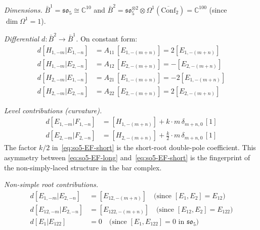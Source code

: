 \begin{computation}

\emph{Dimensions.}
$\bar{B}^1 = \mathfrak{so}_5 \cong \mathbb{C}^{10}$ and
$\bar{B}^2 = \mathfrak{so}_5^{\otimes 2} \otimes \Omega^1(\overline{\mathrm{Conf}}_2)
= \mathbb{C}^{100}$ (since $\dim \Omega^1 = 1$).

\emph{Differential $d\colon \bar{B}^2 \to \bar{B}^1$.}
On constant form:
\begin{align}
d[H_{1,-m}|E_{1,-n}] &= A_{11}\,[E_{1,-(m+n)}] = 2[E_{1,-(m+n)}]
\\
d[H_{1,-m}|E_{2,-n}] &= A_{12}\,[E_{2,-(m+n)}] = -[E_{2,-(m+n)}]
\\
d[H_{2,-m}|E_{1,-n}] &= A_{21}\,[E_{1,-(m+n)}] = -2[E_{1,-(m+n)}]
\\
d[H_{2,-m}|E_{2,-n}] &= A_{22}\,[E_{2,-(m+n)}] = 2[E_{2,-(m+n)}]
\label{eq:so5-H2E2}
\end{align}

\emph{Level contributions (curvature).}
\begin{align}
d[E_{1,-m}|F_{1,-n}] &= [H_{1,-(m+n)}] + k \cdot m\,\delta_{m+n,0}\,[1]
\label{eq:so5-EF-long} \\
d[E_{2,-m}|F_{2,-n}] &= [H_{2,-(m+n)}] + \tfrac{k}{2}\cdot m\,\delta_{m+n,0}\,[1]
\label{eq:so5-EF-short}
\end{align}
The factor $k/2$ in~\eqref{eq:so5-EF-short} is the short-root
double-pole coefficient. This asymmetry between
\eqref{eq:so5-EF-long} and~\eqref{eq:so5-EF-short} is the
fingerprint of the non-simply-laced structure in the bar complex.

\emph{Non-simple root contributions.}
\begin{align}
d[E_{1,-m}|E_{2,-n}] &= [E_{12,-(m+n)}]
\quad\text{(since $[E_1, E_2] = E_{12}$)} \\
d[E_{12,-m}|E_{2,-n}] &= [E_{122,-(m+n)}]
\quad\text{(since $[E_{12}, E_2] = E_{122}$)} \\
d[E_1|E_{122}] &= 0
\quad\text{(since $[E_1, E_{122}] = 0$ in $\mathfrak{so}_5$)}
\end{align}
\end{computation}

